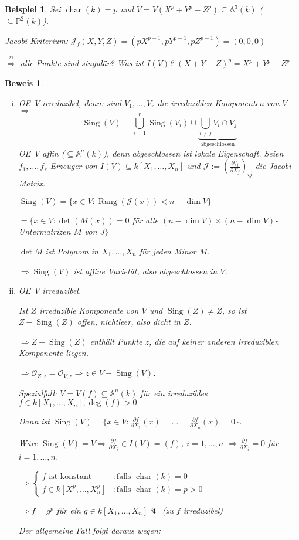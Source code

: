 \documentclass[a4paper, 12pt, numbers=noendperiod, chapterprefix=true]{scrbook}
\theoremstyle{break}
\theoremstyle{nonumberbreak}
\newtheorem{nnBsp}{Beispiel}
\newtheorem{Bew}{Beweis}
\theoremstyle{nonumberplain}
\newcommand{\quot}[1]{\textrm{\glqq}{#1}\textrm{\grqq}}
\DeclareMathOperator{\Rang}{Rang}
\DeclareMathOperator{\Sing}{Sing}
\DeclareMathOperator{\chara}{char}
\newcommand{\A}{\mathbb{A}}
\newcommand{\IP}{\mathbb{P}}%
\newcommand{\calJ}{\mathcal{J}}
\newcommand{\calO}{\mathcal{O}}
\renewcommand{\OE}{O\!\!E~}
\begin{document}
\begin{nnBsp}
Sei $\chara(k)=p$ und $V=V(X^p+Y^p-Z^p)\subseteq\A^3(k)$ ($\subseteq\IP^2(k)$).

Jacobi-Kriterium: $\calJ_f(X,Y,Z)=(pX^{p-1}, pY^{p-1}, pZ^{p-1})=(0,0,0)$

$\overset{??}{\Rightarrow}$ alle Punkte sind singul\"ar? Was ist $I(V)$?
$(X+Y-Z)^p=X^p+Y^p-Z^p$
\end{nnBsp}


\begin{Bew}\begin{enumerate}[i)]
\item
	\OE $V$ irreduzibel, denn: sind $V_1,\ldots, V_r$ die irreduziblen Komponenten von $V$ $\Rightarrow $ 
		\[\Sing(V)=\bigcup\limits_{i=1}^r \Sing(V_i)\cup \underbrace{\bigcup\limits_{i\ne j}V_i\cap V_j}_{\text{abgeschlossen}}\]
	\OE $V$ affin ($\subseteq\A^n(k)$), denn \quot{abgeschlossen} ist lokale Eigenschaft. Seien $f_1,\ldots ,f_r$ Erzeuger von $I(V)\subseteq k[X_1,\ldots ,X_n]$ und $\calJ:=(\frac{\partial f_i}{\partial X_j})_{ij}$ die Jacobi-Matrix.
	
	$\Sing(V)=\{x\in V: \Rang(\calJ(x))<n-\dim V\}$
	
	$=\{x\in V:\det(M(x))=0$ f\"ur alle $(n-\dim V)\times(n-\dim V)$-Untermatrizen $M$ von $J\}$
	
	$\det M$ ist Polynom in $X_1,\ldots ,X_n$ f\"ur jeden Minor $M$.
	
	$\Rightarrow \Sing(V)$ ist affine Variet\"at, also abgeschlossen in $V$.
\item
	\OE $V$ irreduzibel.
	
	Ist $Z$ irreduzible Komponente von $V$ und $\Sing(Z)\ne Z$, so ist $Z-\Sing(Z)$ offen, nichtleer, also dicht in $Z$.
	
	$\Rightarrow Z-\Sing(Z)$ enth\"alt Punkte $z$, die auf keiner anderen irreduziblen Komponente liegen.
	
	$\Rightarrow \calO_{Z,z}=\calO_{V,z}\Rightarrow z\in V-\Sing(V)$.
	
	\emph{Spezialfall}: $V=V(f)\subseteq\A^n(k)$ f\"ur ein irreduzibles $f\in k[X_1,\ldots ,X_n], \deg(f)>0$
	
	Dann ist $\Sing(V)=\{x\in V: \frac{\partial f}{\partial X_1}(x)=\ldots =\frac{\partial f}{\partial X_n}(x)=0\}$.
	
	W\"are $\Sing(V)=V\Rightarrow \frac{\partial f}{\partial X_i}\in I(V)=(f)$, $i=1,\ldots ,n$ $\Rightarrow \frac{\partial f}{\partial X_i}=0$ f\"ur $i=1,\ldots ,n$.
	
	$\Rightarrow \left\{\begin{array}{ll}
		f \text{ ist konstant} & :\text{falls } \chara(k)=0\\
		f\in k[X_1^p,\ldots ,X_n^p] & :\text{falls }\chara(k)=p>0
	\end{array}\right.$
	
	$\Rightarrow f=g^p$ f\"ur ein $g\in k[X_1,\ldots ,X_n] \lightning$ (zu $f$ irreduzibel)
	
	Der allgemeine Fall folgt daraus wegen:
\end{enumerate}\end{Bew}
\end{document}
